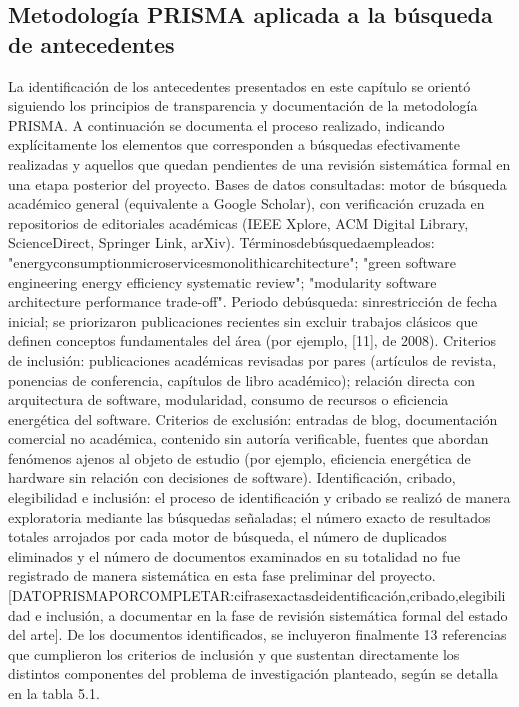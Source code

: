 \subsection{Metodología PRISMA aplicada a la búsqueda de antecedentes}
La identificación de los antecedentes presentados en este capítulo se orientó siguiendo los principios de transparencia y documentación de la metodología PRISMA. A continuación se documenta el proceso realizado, indicando explícitamente los elementos que corresponden a búsquedas efectivamente realizadas y aquellos que quedan pendientes de una revisión sistemática formal en una etapa posterior del proyecto. Bases de datos consultadas: motor de búsqueda académico general (equivalente a Google Scholar), con verificación cruzada en repositorios de editoriales académicas (IEEE Xplore, ACM Digital Library, ScienceDirect, Springer Link, arXiv). Términosdebúsquedaempleados: "energyconsumptionmicroservicesmonolithicarchitecture"; "green software engineering energy efficiency systematic review"; "modularity software architecture performance trade-off". Periodo debúsqueda: sinrestricción de fecha inicial; se priorizaron publicaciones recientes sin excluir trabajos clásicos que definen conceptos fundamentales del área (por ejemplo, [11], de 2008). Criterios de inclusión: publicaciones académicas revisadas por pares (artículos de revista, ponencias de conferencia, capítulos de libro académico); relación directa con arquitectura de software, modularidad, consumo de recursos o eficiencia energética del software. Criterios de exclusión: entradas de blog, documentación comercial no académica, contenido sin autoría verificable, fuentes que abordan fenómenos ajenos al objeto de estudio (por ejemplo, eficiencia energética de hardware sin relación con decisiones de software). Identificación, cribado, elegibilidad e inclusión: el proceso de identificación y cribado se realizó de manera exploratoria mediante las búsquedas señaladas; el número exacto de resultados totales arrojados por cada motor de búsqueda, el número de duplicados eliminados y el número de documentos examinados en su totalidad no fue registrado de manera sistemática en esta fase preliminar del proyecto. [DATOPRISMAPORCOMPLETAR:cifrasexactasdeidentificación,cribado,elegibilidad e inclusión, a documentar en la fase de revisión sistemática formal del estado del arte]. De los documentos identificados, se incluyeron finalmente 13 referencias que cumplieron los criterios de inclusión y que sustentan directamente los distintos componentes del problema de investigación planteado, según se detalla en la tabla 5.1.

